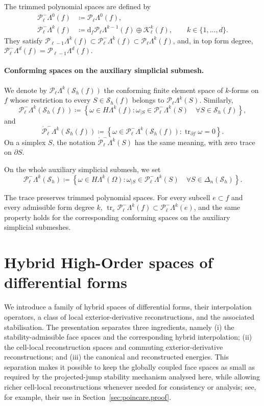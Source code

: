 \documentclass[a4paper,11pt]{article}
\theoremstyle{definition}
\newcommand{\DIFF}{\mathrm{d}}
\newcommand{\Sh}{\mathcal{S}_h}
\newcommand{\FM}[1]{\Delta_{#1}}
\newcommand{\PL}[2]{\mathcal{P}_{#1}\Lambda^{#2}}
\newcommand{\PLtrim}[2]{\mathcal{P}_{#1}^{-}\Lambda^{#2}}
\newcommand{\trc}{\operatorname{tr}}
\newcommand{\PLtrimz}[2]{\mathring{\mathcal P}_{#1}^{-}\Lambda^{#2}}
\begin{document}
The trimmed polynomial spaces are defined by
\begin{subequations}\label{eq:def-trimmed-polynomial-forms}
\begin{align*}
  \PLtrim{\ell}{0}(f)
  &\coloneqq
  \PL{\ell}{0}(f),
  \\
  \PLtrim{\ell}{k}(f)
  &\coloneqq
  \DIFF_f\PL{\ell}{k-1}(f)
  \oplus
  \mathcal K_\ell^k(f),
  \qquad
  k\in\{1,\ldots,d\}.
\end{align*}
\end{subequations}
They satisfy $\PL{\ell-1}{k}(f) \subset \PLtrim{\ell}{k}(f) \subset \PL{\ell}{k}(f)$, and, in top form degree, $\PLtrim{\ell}{d}(f) = \PL{\ell-1}{d}(f)$.

\paragraph{Conforming spaces on the auxiliary simplicial submesh.}

We denote by $\PL{\ell}{k}(\Sh(f))$ the conforming finite element space of $k$-forms on $f$ whose restriction to every $S\in\Sh(f)$ belongs to $\PL{\ell}{k}(S)$.
Similarly,
\[
  \PLtrim{\ell}{k}(\Sh(f))
  \coloneqq
  \left\{
    \omega\in H\Lambda^k(f):
    \omega_{|S}\in\PLtrim{\ell}{k}(S)
    \quad
    \forall S\in\Sh(f)
  \right\},
\]
and
\[
  \PLtrimz{\ell}{k}(\Sh(f))
  \coloneqq
  \left\{
    \omega\in\PLtrim{\ell}{k}(\Sh(f)):
    \trc_{\partial f}\omega=0
  \right\}.
\]
On a simplex $S$, the notation $\PLtrimz{\ell}{k}(S)$ has the same meaning, with zero trace on $\partial S$.

On the whole auxiliary simplicial submesh, we set
\[
  \PLtrim{\ell}{k}(\Sh)
  \coloneqq
  \left\{
    \omega\in H\Lambda^k(\Omega):
    \omega_{|S}\in\PLtrim{\ell}{k}(S)
    \quad
    \forall S\in\FM{n}(\Sh)
  \right\}.
\]

The trace preserves trimmed polynomial spaces.
For every subcell $e\subset f$ and every admissible form degree $k$, $\trc_e\PLtrim{\ell}{k}(f) \subset \PLtrim{\ell}{k}(e)$, and the same property holds for the corresponding conforming spaces on the auxiliary simplicial submeshes.

\section{Hybrid High-Order spaces of differential forms}
\label{sec:hho.forms}

We introduce a family of hybrid spaces of differential forms, their interpolation operators, a class of local exterior-derivative reconstructions, and the associated stabilisation.
The presentation separates three ingredients, namely (i) the stability-admissible face spaces and the corresponding hybrid interpolation; (ii) the cell-local reconstruction spaces and commuting exterior-derivative reconstructions; and (iii) the canonical and reconstructed energies.
This separation makes it possible to keep the globally coupled face spaces as small as required by the projected-jump stability mechanism analysed here, while allowing richer cell-local reconstructions whenever needed for consistency or analysis; see, for example, their use in Section~\ref{sec:poincare.proof}.
\end{document}
